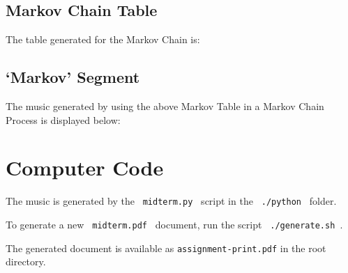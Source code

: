 \documentclass[10pt,letterpaper]{article}
\newcommand{\code}[1]{\colorbox{light-gray}{\texttt{#1}}}
\begin{document}
\begin{quote}
{%
\parindent 0pt
\noindent
\ifx\preLilyPondExample \undefined
\else
  \expandafter\preLilyPondExample
\fi
\def\lilypondbook{}%
%
\ifx\postLilyPondExample \undefined
\else
  \expandafter\postLilyPondExample
\fi
}
\end{quote}

\clearpage{}

\subsection*{Markov Chain Table}
The table generated for the Markov Chain is:


\clearpage{}

\subsection*{`Markov' Segment}
The music generated by using the above Markov Table in a Markov Chain Process
is displayed below:

\begin{quote}
{%
\parindent 0pt
\noindent
\ifx\preLilyPondExample \undefined
\else
  \expandafter\preLilyPondExample
\fi
\def\lilypondbook{}%
%
\ifx\postLilyPondExample \undefined
\else
  \expandafter\postLilyPondExample
\fi
}
\end{quote}

\clearpage{}

\section*{Computer Code}
The music is generated by the \code{ midterm.py } script in the
\code{ ./python } folder.

To generate a new \code{ midterm.pdf } document, run the script
\code{ ./generate.sh  }.

The generated document is available as \code{assignment-print.pdf} in the
root directory.
\end{document}
